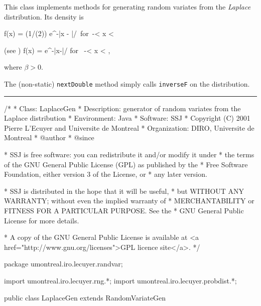 
This class implements methods for generating random variates from the 
{\em Laplace\/} distribution. Its density is
\begin{htmlonly}
\eq
  f(x) = (1/(2\beta)) e^{-|x - \mu|/\beta}\mbox{ for }-\infty < x < \infty
\endeq
\end{htmlonly}
\begin{latexonly}
(see \cite[page 165]{tJOH95b})
\eq
    f(x) = e^{-|x-\mu|/\beta}
    \qquad \mbox {for } -\infty < x < \infty,           
\endeq
\end{latexonly}
where $\beta > 0$.

The (non-static) \texttt{nextDouble} method simply calls \texttt{inverseF} on the
distribution. 

\bigskip\hrule


\begin{code}
\begin{hide}
/*
 * Class:        LaplaceGen
 * Description:  generator of random variates from the Laplace distribution
 * Environment:  Java
 * Software:     SSJ 
 * Copyright (C) 2001  Pierre L'Ecuyer and Universite de Montreal
 * Organization: DIRO, Universite de Montreal
 * @author       
 * @since

 * SSJ is free software: you can redistribute it and/or modify it under
 * the terms of the GNU General Public License (GPL) as published by the
 * Free Software Foundation, either version 3 of the License, or
 * any later version.

 * SSJ is distributed in the hope that it will be useful,
 * but WITHOUT ANY WARRANTY; without even the implied warranty of
 * MERCHANTABILITY or FITNESS FOR A PARTICULAR PURPOSE.  See the
 * GNU General Public License for more details.

 * A copy of the GNU General Public License is available at
   <a href="http://www.gnu.org/licenses">GPL licence site</a>.
 */
\end{hide}
package umontreal.iro.lecuyer.randvar;\begin{hide}
import umontreal.iro.lecuyer.rng.*;
import umontreal.iro.lecuyer.probdist.*;
\end{hide}

public class LaplaceGen extends RandomVariateGen \begin{hide} {
   private double mu;
   private double beta;
\end{hide}\end{code}

